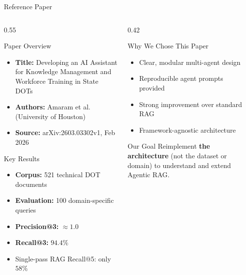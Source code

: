 \documentclass[aspectratio=169]{beamer}
\begin{document}
\begin{frame}{Reference Paper}
  \begin{columns}[T]
    \begin{column}{0.55\textwidth}
      \begin{block}{Paper Overview}
        \small
        \begin{itemize}
          \item \textbf{Title:} Developing an AI Assistant for Knowledge Management and Workforce Training in State DOTs
          \item \textbf{Authors:} Amaram et al. (University of Houston)
          \item \textbf{Source:} arXiv:2603.03302v1, Feb 2026
        \end{itemize}
      \end{block}
      \vspace{0.3cm}
      \begin{exampleblock}{Key Results}
        \small
        \begin{itemize}
          \item \textbf{Corpus:} 521 technical DOT documents
          \item \textbf{Evaluation:} 100 domain-specific queries
          \item \textbf{Precision@3:} $\approx 1.0$
          \item \textbf{Recall@3:} $94.4\%$
          \item Single-pass RAG Recall@5: only $58\%$
        \end{itemize}
      \end{exampleblock}
    \end{column}
    \begin{column}{0.42\textwidth}
      \begin{alertblock}{Why We Chose This Paper}
        \small
        \begin{itemize}
          \item Clear, modular multi-agent design
          \item Reproducible agent prompts provided
          \item Strong improvement over standard RAG
          \item Framework-agnostic architecture
        \end{itemize}
      \end{alertblock}
      \vspace{0.3cm}
      \begin{block}{Our Goal}
        \small
        Reimplement \textbf{the architecture} (not the dataset or domain) to understand and extend Agentic RAG.
      \end{block}
    \end{column}
  \end{columns}
\end{frame}
\end{document}
